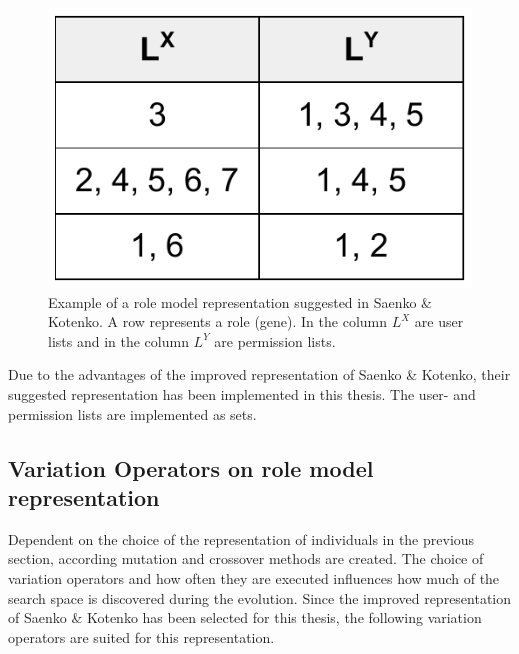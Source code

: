         \begin{figure}
            \centering
            \includegraphics[scale=0.4]{./Figures/ComplexRepresentation2}
            \caption{Example of a role model representation suggested in Saenko \& Kotenko\cite{saenko2012design}. A row represents a role (gene). In the column $L^X$ are user lists and in the column $L^Y$ are permission lists.}
            \label{fig:representation3}
        \end{figure}
        Due to the advantages of the improved representation of Saenko \& Kotenko\cite{saenko2012design}, their suggested representation has been implemented in this thesis. The user- and permission lists are implemented as sets.
    
    \subsection{Variation Operators on role model representation}
    Dependent on the choice of the representation of individuals in the previous section, according mutation and crossover methods are created. The choice of variation operators and how often they are executed influences how much of the search space is discovered during the evolution. Since the improved representation of Saenko \& Kotenko\cite{saenko2012design} has been selected for this thesis, the following variation operators are suited for this representation.
